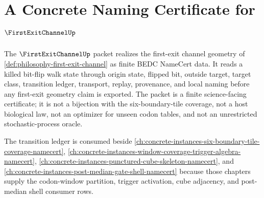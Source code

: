 \chapter{A Concrete Naming Certificate for $\FirstExitChannelUp$}
\label{ch:concrete-instances-first-exit-channel-namecert}

The $\FirstExitChannelUp$ packet realizes the first-exit channel geometry of \autoref{def:philosophy-first-exit-channel} as finite BEDC NameCert data. It reads a killed bit-flip walk state through origin state, flipped bit, outside target, target class, transition ledger, transport, replay, provenance, and local naming before any first-exit geometry claim is exported. The packet is a finite science-facing certificate; it is not a bijection with the six-boundary-tile coverage, not a host biological law, not an optimizer for unseen codon tables, and not an unrestricted stochastic-process oracle.

The transition ledger is consumed beside \autoref{ch:concrete-instances-six-boundary-tile-coverage-namecert}, \autoref{ch:concrete-instances-window-coverage-trigger-algebra-namecert}, \autoref{ch:concrete-instances-punctured-cube-skeleton-namecert}, and \autoref{ch:concrete-instances-post-median-gate-shell-namecert} because those chapters supply the codon-window partition, trigger activation, cube adjacency, and post-median shell consumer rows.




